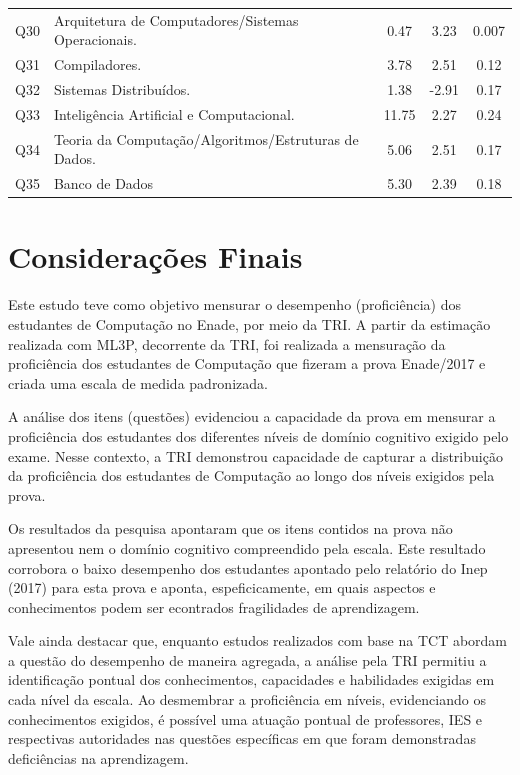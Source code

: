 \documentclass[12pt]{article}
\begin{document}
\begin{table}[htbp]
\begin{tabular}{c|l|c|c|c}
  Q30       & Arquitetura de Computadores/Sistemas Operacionais.   &  0.47       &   3.23    &  0.007   \\
  Q31       & Compiladores.                                        &  3.78       &   2.51    &  0.12    \\
  Q32       & Sistemas Distribuídos.                               &  1.38      &   -2.91   &  0.17   \\
  Q33       & Inteligência Artificial e Computacional.             &  11.75      &   2.27    &  0.24  \\
  Q34       & Teoria da Computação/Algoritmos/Estruturas de Dados. &  5.06       &   2.51    &  0.17   \\
  Q35       & Banco de Dados                                       &  5.30       &   2.39    &  0.18      \\
\hline\hline
\end{tabular}
\end{table}
\vskip0.3cm


\newpage






\section{Considerações Finais}

Este estudo teve como objetivo mensurar o desempenho (proficiência) dos estudantes de Computação no Enade, por meio da TRI. A partir da estimação realizada com ML3P, decorrente da TRI, foi realizada a mensuração da proficiência dos estudantes de Computação que fizeram a prova Enade/2017 e criada uma escala de medida padronizada.

A análise dos itens (questões) evidenciou a capacidade da prova em mensurar a proficiência dos estudantes dos diferentes níveis de domínio cognitivo exigido pelo exame. Nesse contexto, a TRI demonstrou capacidade de capturar a distribuição da proficiência dos estudantes de Computação ao longo dos níveis exigidos pela prova.

Os resultados da pesquisa apontaram que os itens contidos na prova não apresentou nem o domínio cognitivo compreendido pela escala. Este resultado corrobora  o baixo desempenho dos estudantes apontado pelo relatório do Inep (2017) para esta prova e aponta, espeficicamente, em quais aspectos e conhecimentos podem ser econtrados fragilidades de aprendizagem.

Vale ainda destacar que, enquanto estudos realizados com base na TCT abordam a questão do desempenho de maneira agregada, a análise pela TRI permitiu a identificação pontual dos conhecimentos, capacidades e habilidades exigidas em cada nível da escala. Ao desmembrar a proficiência em níveis, evidenciando os conhecimentos exigidos, é possível uma atuação pontual de professores, IES e respectivas autoridades nas questões específicas em que foram demonstradas deficiências na aprendizagem. 
\end{document}
